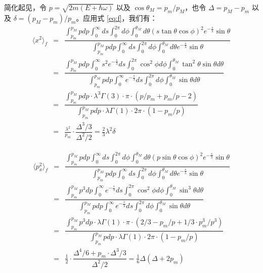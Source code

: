 简化起见，令 $p = \sqrt{2m(E+\hbar\omega)}$ 以及 $\cos\theta_M=p_m/p_M$，也令 $\Delta=p_M-p_m$ 以及 $\delta=(p_M-p_m)/p_m$。应用式 \ref{eq:f}，我们有：
\begin{eqnarray*}
\langle x^2\rangle_f &=& \dfrac{\int_{p_m}^{p_M} pdp\int_0^{\infty} ds\int_0^{2\pi}d\phi\int_0^{\theta_M}d\theta (s\tan\theta\cos\phi)^2e^{-\frac{s}{\lambda}}\sin\theta}{\int_{p_m}^{p_M} pdp\int_0^{\infty} ds\int_0^{2\pi}d\phi\int_0^{\theta_M}d\theta e^{-\frac{s}{\lambda}}\sin\theta}\\
&=& \dfrac{\int_{p_m}^{p_M} pdp\int_0^{\infty} s^2e^{-\frac{s}{\lambda}}ds\int_0^{2\pi}\cos^2\phi d\phi\int_0^{\theta_M}\tan^2\theta\sin\theta d\theta}{\int_{p_m}^{p_M} pdp\int_0^{\infty} e^{-\frac{s}{\lambda}}ds\int_0^{2\pi}d\phi\int_0^{\theta_M}\sin\theta d\theta}\\
&=& \dfrac{\int_{p_m}^{p_M}pdp\cdot\lambda^3\Gamma(3)\cdot\pi\cdot(p/p_m+p_m/p-2)}{\int_{p_m}^{p_M}pdp\cdot\lambda\Gamma(1)\cdot2\pi\cdot(1-p_m/p)}\\
&=& \frac{\lambda^2}{p_m}\cdot\dfrac{\Delta^3/3}{\Delta^2/2} = \frac{2}{3}\lambda^2\delta
\end{eqnarray*}

\begin{eqnarray*}
\langle p_x^2\rangle_f &=& \dfrac{\int_{p_m}^{p_M} pdp\int_0^{\infty} ds\int_0^{2\pi}d\phi\int_0^{\theta_M}d\theta (p\sin\theta\cos\phi)^2e^{-\frac{s}{\lambda}}\sin\theta}{\int_{p_m}^{p_M} pdp\int_0^{\infty} ds\int_0^{2\pi}d\phi\int_0^{\theta_M}d\theta e^{-\frac{s}{\lambda}}\sin\theta}\\
&=& \dfrac{\int_{p_m}^{p_M} p^3dp\int_0^{\infty} e^{-\frac{s}{\lambda}}ds\int_0^{2\pi}\cos^2\phi d\phi\int_0^{\theta_M}\sin^3\theta d\theta}{\int_{p_m}^{p_M} pdp\int_0^{\infty} e^{-\frac{s}{\lambda}}ds\int_0^{2\pi}d\phi\int_0^{\theta_M}\sin\theta d\theta}\\
&=& \dfrac{\int_{p_m}^{p_M}p^3dp\cdot\lambda\Gamma(1)\cdot\pi\cdot(2/3-p_m/p+1/3\cdot p_m^3/p^3)}{\int_{p_m}^{p_M}pdp\cdot\lambda\Gamma(1)\cdot2\pi\cdot(1-p_m/p)}\\
&=& \frac{1}{2}\cdot\dfrac{\Delta^4/6+p_m\cdot\Delta^3/3}{\Delta^2/2} = \frac{1}{6}\Delta(\Delta+2p_m)
\end{eqnarray*}

